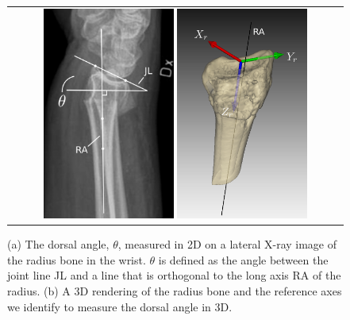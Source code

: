\documentclass[10pt, a4paper]{article}
\begin{document}
\begin{enumerate}
\begin{figure}[!htbp]
\centering
\begin{tabular}{c}
\includegraphics[width=0.4\textwidth]{figures/research/wrist_project_figure1a.png}
\vspace*{2mm}
\includegraphics[width=0.4\textwidth]{figures/research/wrist_project_figure1b.png}
\end{tabular}
\caption{\label{fig:wrist} (a) The dorsal angle, $\theta$, measured in 2D on a lateral X-ray image of the radius bone in the wrist. $\theta$ is defined as the angle between the joint line JL and a line that is orthogonal to the long axis RA of the radius. (b) A 3D rendering of the radius bone and the reference axes we identify to measure the dorsal angle in 3D.}
\end{figure}



\end{enumerate}
\end{document}

